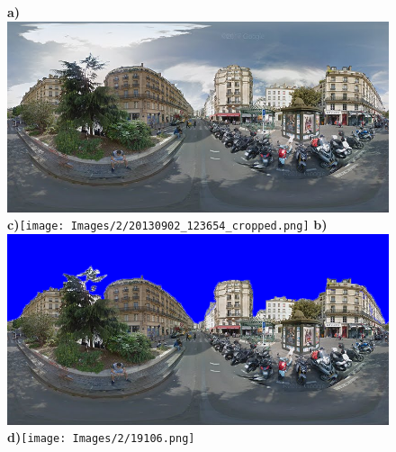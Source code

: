 \documentclass{article}
\begin{document}
\begin{figure}
\centering    
\textbf{\scriptsize{a)}}\includegraphics[scale=0.25]{Images/2/panorama-JtVHmEl7WCiz1xJ0bcJpBg-1.png} 
\textbf{\scriptsize{c)}}\texttt{[image: Images/2/20130902\_123654\_cropped.png]} 
\textbf{\scriptsize{b)}}\includegraphics[scale=0.25]{Images/2/panorama-JtVHmEl7WCiz1xJ0bcJpBg-1-marked.png} 
\textbf{\scriptsize{d)}}\texttt{[image: Images/2/19106.png]} 
 \label{fig:origmarked}  
\end{figure} 



\clearpage
\end{document}
